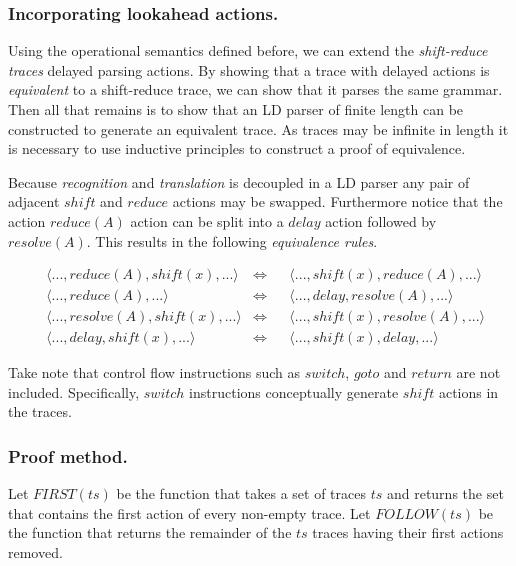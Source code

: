\documentclass[A4]{sig-alternate}
\begin{document}
\subsubsection{Incorporating lookahead actions.}

Using the operational semantics defined before, we can extend the \emph{shift-reduce traces} delayed parsing actions.
By showing that a trace with delayed actions is \emph{equivalent} to a shift-reduce trace, we can show that it parses the same grammar.
Then all that remains is to show that an LD parser of finite length can be constructed to generate an equivalent trace.
As traces may be infinite in length it is necessary to use inductive principles to construct a proof of equivalence.

Because \emph{recognition} and \emph{translation} is decoupled in a LD parser any pair of adjacent $shi\!ft$ and $reduce$ actions may be swapped.
Furthermore notice that the action $reduce(A)$ action can be split into a $delay$ action followed by $resolve(A)$.
This results in the following \emph{equivalence rules}.

\begin{align*}
&\langle ..., reduce(A), shi\!ft(x), ... \rangle  &\iff&& \langle ..., shi\!ft(x), reduce(A), ... \rangle  \tag{eq-1}\\
&\langle ..., reduce(A), ... \rangle              &\iff&& \langle ..., delay, resolve(A), ... \rangle      \tag{eq-2}\\
&\langle ..., resolve(A), shi\!ft(x), ... \rangle &\iff&& \langle ..., shi\!ft(x), resolve(A), ... \rangle \tag{eq-3}\\
&\langle ..., delay, shi\!ft(x), ... \rangle      &\iff&& \langle ..., shi\!ft(x), delay, ... \rangle      \tag{eq-4}
\end{align*}

Take note that control flow instructions such as $switch$, $goto$ and $return$ are not included.
Specifically, $switch$ instructions conceptually generate $shi\!ft$ actions in the traces.

\subsubsection{Proof method.}

Let $F\!I\!RST(ts)$ be the function that takes a set of traces $ts$ and returns the set that contains the first action of every non-empty trace.
Let $FOLLOW(ts)$ be the function that returns the remainder of the $ts$ traces having their first actions removed.
\end{document}

